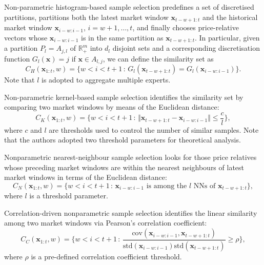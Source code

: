 Non-parametric histogram-based sample selection \citep{gyorfi03} predefines a set of discretised partitions, partitions both the latest market window $\mathbf{x}_{t-w+1:t}$ and the historical market window $\mathbf{x}_{i-w:i-1}$, $i = w + 1, \ldots, t$, and finally chooses price-relative vectors whose $\mathbf{x}_{i-w:i-1}$  is in the same partition as $\mathbf{x}_{t-w+1:t}$. In particular, given a partition $P_l = A_{j,l}$ of $\mathbb{R}^m_+$ into $d_l$ disjoint sets and a corresponding  discretisation function $G_l(\mathbf{x}) = j$ if $\mathbf{x} \in A_{l,j}$, we can define the similarity set as
\begin{equation}
	C_{H}(\mathbf{x}_{1:t}, w) = \Big\{w < i < t+1 \, : \, G_l(\mathbf{x}_{t-w+1:t}) = G_l(\mathbf{x}_{i-w:i-1})\Big\}.
\end{equation}
Note that $l$ is adopted to aggregate multiple experts.

Non-parametric kernel-based sample selection \citep{bnn} identifies the similarity set by comparing two market windows by means of the Euclidean distance:
\begin{equation}
	C_{K}(\mathbf{x}_{1:t}, w) = \Big\{w < i < t+1 \, : \, \Vert\mathbf{x}_{t-w+1:t} - \mathbf{x}_{i-w:i-1}\Vert \leq \frac{c}{l}\Big\},
\end{equation}
where $c$ and $l$ are thresholds used to control the number of similar samples. Note that the authors adopted two threshold parameters for theoretical analysis.

Nonparametric nearest-neighbour sample selection \citep{bnn2} looks for those price relatives whose preceding market windows are within the nearest neighbours of latest market windows in terms of the Euclidean distance:
\begin{equation}
	C_{N}(\mathbf{x}_{1:t}, w) = \Big\{w < i < t+1 \, : \,  \mathbf{x}_{i-w:i-1} \text{ is among the } l \text{ NNs of } \mathbf{x}_{t-w+1:t}\Big\},
\end{equation}
where $l$ is a threshold parameter.

Correlation-driven nonparametric sample selection \citep{corn} identifies the linear similarity among two market windows via Pearson's correlation coefficient:
\begin{equation}
	C_{C}(\mathbf{x}_{1:t}, w) = \Big\{w < i < t+1 \, : \,  \frac{\mathrm{cov}(\mathbf{x}_{i-w:i-1}, \mathbf{x}_{t-w+1:t})}{\mathrm{std}(\mathbf{x}_{i-w:i-1})\mathrm{std}(\mathbf{x}_{t-w+1:t})} \geq \rho\Big\},
\end{equation}
where $\rho$ is a pre-defined correlation coefficient threshold.


